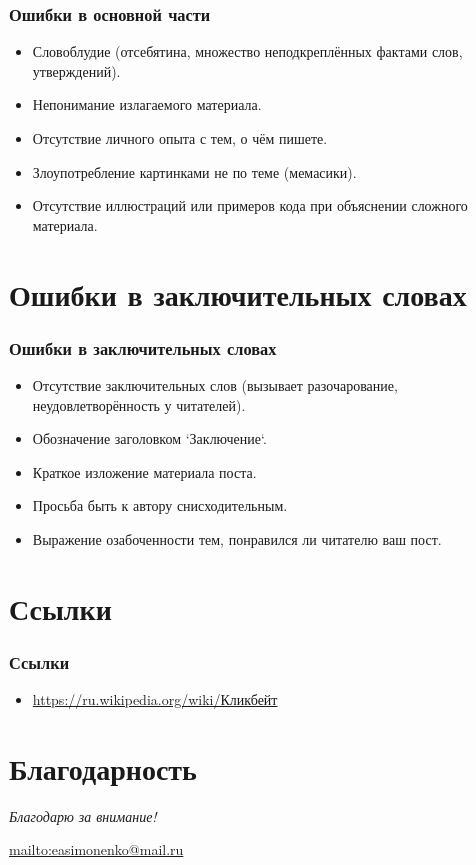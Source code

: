 \documentclass[12pt]{beamer}
\begin{document}
\begin{frame}
  \frametitle{Ошибки в основной части}
  \begin{itemize}
  \item Словоблудие (отсебятина, множество неподкреплённых фактами слов, утверждений).
  \item Непонимание излагаемого материала.
  \item Отсутствие личного опыта с тем, о чём пишете.
  \item Злоупотребление картинками не по теме (мемасики).
  \item Отсутствие иллюстраций или примеров кода при объяснении сложного материала.
  \end{itemize}
\end{frame}

\section{Ошибки в заключительных словах}

\begin{frame}
  \frametitle{Ошибки в заключительных словах}
  \begin{itemize}
  \item Отсутствие заключительных слов (вызывает разочарование, неудовлетворённость у читателей).
  \item Обозначение заголовком `Заключение`.
  \item Краткое изложение материала поста.
  \item Просьба быть к автору снисходительным.
  \item Выражение озабоченности тем, понравился ли читателю ваш пост.
  \end{itemize}
\end{frame}

\section{Ссылки}

\begin{frame}
  \frametitle{Ссылки}
  \begin{itemize}
  \item \url{https://ru.wikipedia.org/wiki/Кликбейт}
  \end{itemize}
\end{frame}

\section*{Благодарность}

\begin{frame}
  \center
  \textit{Благодарю за внимание!}

  \textbf{\textsl{\inserttitle}}

  \insertauthor

  \url{mailto:easimonenko@mail.ru}

  \insertinstitute
\end{frame}
\end{document}
